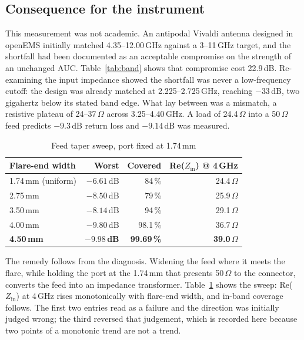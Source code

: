 \documentclass[conference]{IEEEtran}
\begin{document}
\subsection{Consequence for the instrument}
This measurement was not academic. An antipodal Vivaldi antenna
\cite{gazit} designed in openEMS \cite{openems} initially matched
4.35--12.00\,GHz against a 3--11\,GHz target, and the shortfall had been
documented as an acceptable compromise on the strength of an unchanged AUC.
Table~\ref{tab:band} shows that compromise cost 22.9\,dB. Re-examining the
input impedance showed the shortfall was never a low-frequency cutoff: the
design was already matched at 2.225--2.725\,GHz, reaching $-33$\,dB, two
gigahertz below its stated band edge. What lay between was a mismatch, a
resistive plateau of 24--37\,$\Omega$ across 3.25--4.40\,GHz. A load of
24.4\,$\Omega$ into a 50\,$\Omega$ feed predicts $-9.3$\,dB return loss and
$-9.14$\,dB was measured.

\begin{table}[t]
\caption{Feed taper sweep, port fixed at 1.74\,mm}
\label{tab:feed}
\centering
\footnotesize
\begin{tabular}{@{}lrrr@{}}
\toprule
\textbf{Flare-end width} & \textbf{Worst} & \textbf{Covered} &
\textbf{Re($Z_\mathrm{in}$) @ 4\,GHz} \\
\midrule
1.74\,mm (uniform) & $-6.61$\,dB & 84\,\% & 24.4\,$\Omega$ \\
2.75\,mm & $-8.50$\,dB & 79\,\% & 25.9\,$\Omega$ \\
3.50\,mm & $-8.14$\,dB & 94\,\% & 29.1\,$\Omega$ \\
4.00\,mm & $-9.80$\,dB & 98.1\,\% & 36.7\,$\Omega$ \\
\textbf{4.50\,mm} & $\mathbf{-9.98}$\,\textbf{dB} & \textbf{99.69\,\%} &
\textbf{39.0\,$\Omega$} \\
\bottomrule
\end{tabular}
\end{table}

The remedy follows from the diagnosis. Widening the feed where it meets the
flare, while holding the port at the 1.74\,mm that presents 50\,$\Omega$ to
the connector, converts the feed into an impedance transformer.
Table~\ref{tab:feed} shows the sweep: Re($Z_\mathrm{in}$) at 4\,GHz rises
monotonically with flare-end width, and in-band coverage follows. The first
two entries read as a failure and the direction was initially judged wrong;
the third reversed that judgement, which is recorded here because two points
of a monotonic trend are not a trend.
\end{document}
